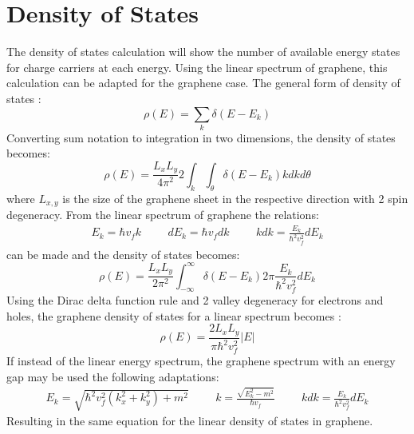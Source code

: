 		\section{Density of States}
		\label{Introduction - Density of States}
			The density of states calculation will show the number of available energy states for charge carriers at each energy. Using the linear spectrum of graphene, this calculation can be adapted for the graphene case. The general form of density of states \cite{b3}:
			\begin{equation}
				\rho\left(E\right)=\sum_{k}\delta\left(E-E_{k}\right)
			\end{equation}
			Converting sum notation to integration in two dimensions, the density of states becomes:
			\begin{equation}
				\rho\left(E\right)=\frac{L_{x}L_{y}}{4\pi^{2}}2\int_{k}\int_{\theta}\delta\left(E-E_{k}\right)kdkd\theta
			\end{equation}
			where $L_{x,y}$ is the size of the graphene sheet in the respective direction with 2 spin degeneracy. From the linear spectrum of graphene the relations:
			\begin{align}
				E_{k}=\hbar v_{f}k
				\hspace{1cm}
				dE_{k}=\hbar v_{f}dk
				\hspace{1cm}
				kdk=\frac{E_{k}}{\hbar^{2}v_{f}^{2}}dE_{k}
			\end{align}
			can be made and the density of states becomes:
			\begin{equation}
				\rho\left(E\right)=\frac{L_{x}L_{y}}{2\pi^{2}}\int_{-\infty}^{\infty}\delta\left(E-E_{k}\right)2\pi \frac{E_{k}}{\hbar^{2}v_{f}^{2}}dE_{k}
			\end{equation}
			Using the Dirac delta function rule and 2 valley degeneracy for electrons and holes, the graphene density of states for a linear spectrum becomes \cite{b3}:
			\begin{equation}
				\rho\left(E\right)=\frac{2L_{x}L_{y}}{\pi\hbar^{2}v_{f}^{2}}|E|
				\label{introduction-dos}
			\end{equation}
			If instead of the linear energy spectrum, the graphene spectrum with an energy gap may be used the following adaptations:
			\begin{align}
				E_{k}=\sqrt{\hbar^{2} v_{f}^{2}\left(k_{x}^{2}+k_{y}^{2}\right)+m^{2}}
				\hspace{1cm}
				k=\frac{\sqrt{E_{k}^{2}-m^{2}}}{\hbar v_{f}}
				\hspace{1cm}
				kdk=\frac{E_{k}}{\hbar^{2}v_{f}^{2}}dE_{k}
			\end{align}
			Resulting in the same equation for the linear density of states in graphene.
